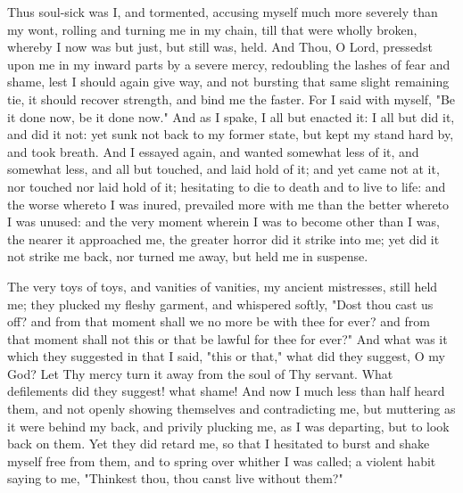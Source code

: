 \documentclass[b5paper,openright,12pt,twoside]{book}
\begin{document}
Thus soul-sick was I, and tormented, accusing myself much more severely
than my wont, rolling and turning me in my chain, till that were wholly
broken, whereby I now was but just, but still was, held. And Thou, O
Lord, pressedst upon me in my inward parts by a severe mercy, redoubling
the lashes of fear and shame, lest I should again give way, and not
bursting that same slight remaining tie, it should recover strength, and
bind me the faster. For I said with myself, "Be it done now, be it done
now." And as I spake, I all but enacted it: I all but did it, and did
it not: yet sunk not back to my former state, but kept my stand hard by,
and took breath. And I essayed again, and wanted somewhat less of it,
and somewhat less, and all but touched, and laid hold of it; and yet
came not at it, nor touched nor laid hold of it; hesitating to die to
death and to live to life: and the worse whereto I was inured, prevailed
more with me than the better whereto I was unused: and the very moment
wherein I was to become other than I was, the nearer it approached me,
the greater horror did it strike into me; yet did it not strike me back,
nor turned me away, but held me in suspense.

The very toys of toys, and vanities of vanities, my ancient mistresses,
still held me; they plucked my fleshy garment, and whispered softly,
"Dost thou cast us off? and from that moment shall we no more be with
thee for ever? and from that moment shall not this or that be lawful
for thee for ever?" And what was it which they suggested in that I said,
"this or that," what did they suggest, O my God? Let Thy mercy turn it
away from the soul of Thy servant. What defilements did they suggest!
what shame! And now I much less than half heard them, and not openly
showing themselves and contradicting me, but muttering as it were behind
my back, and privily plucking me, as I was departing, but to look back
on them. Yet they did retard me, so that I hesitated to burst and
shake myself free from them, and to spring over whither I was called;
a violent habit saying to me, "Thinkest thou, thou canst live without
them?"
\end{document}
